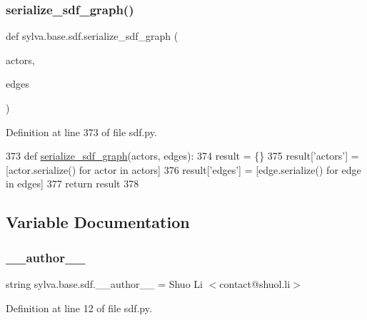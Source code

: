 \subsubsection{\texorpdfstring{serialize\+\_\+sdf\+\_\+graph()}{serialize\_sdf\_graph()}}
{\footnotesize\ttfamily def sylva.\+base.\+sdf.\+serialize\+\_\+sdf\+\_\+graph (\begin{DoxyParamCaption}\item[{}]{actors,  }\item[{}]{edges }\end{DoxyParamCaption})}



Definition at line 373 of file sdf.\+py.


\begin{DoxyCode}
373     \textcolor{keyword}{def }\hyperlink{namespacesylva_1_1base_1_1sdf_af3757c4b0997b952e06efde4a2da8321}{serialize\_sdf\_graph}(actors, edges):
374         result = \{\}
375         result[\textcolor{stringliteral}{'actors'}] = [actor.serialize() \textcolor{keywordflow}{for} actor \textcolor{keywordflow}{in} actors]
376         result[\textcolor{stringliteral}{'edges'}] = [edge.serialize() \textcolor{keywordflow}{for} edge \textcolor{keywordflow}{in} edges]
377         \textcolor{keywordflow}{return} result
378 
\end{DoxyCode}


\subsection{Variable Documentation}
\mbox{\label{namespacesylva_1_1base_1_1sdf_acc6d2abcf12fe231ba37a00428ac6324}} 
\subsubsection{\texorpdfstring{\+\_\+\+\_\+author\+\_\+\+\_\+}{\_\_author\_\_}}
{\footnotesize\ttfamily string sylva.\+base.\+sdf.\+\_\+\+\_\+author\+\_\+\+\_\+ = \textquotesingle{}Shuo Li $<$contact@shuol.\+li$>$\textquotesingle{}\hspace{0.3cm}{\ttfamily [private]}}



Definition at line 12 of file sdf.\+py.

